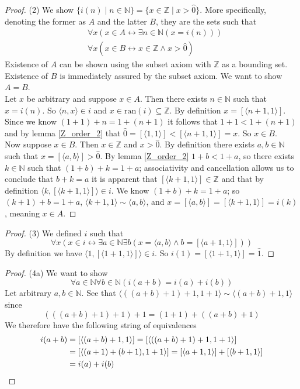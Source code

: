 \documentclass{report}
\begin{document}
\begin{proof}(2)
We show $\{i(n)\mid n\in\mathbb N\}=\{x\in\mathbb Z\mid x>\hat0\}$.
More specifically, denoting the former as $A$ and the latter $B$, they are the sets such that
\begin{align*}
&\forall x(x\in A\leftrightarrow\exists n\in\mathbb N(x=i(n)))\\
&\forall x(x\in B\leftrightarrow x\in\mathbb Z\land x>\hat0)
\end{align*}
Existence of $A$ can be shown using the subset axiom with $\mathbb Z$ as a bounding set. Existence of $B$ is immediately 
assured by the subset axiom. We want to show $A=B$.\\
\indent Let $x$ be arbitrary and suppose $x\in A$. Then there exists $n\in\mathbb N$ such that $x=i(n)$. So $\langle n,x\rangle\in i$ and 
$x\in\text{ran}(i)\subseteq\mathbb Z$. By definition $x=[\langle n+1,1\rangle]$. Since we know $(1+1)+n=1+(n+1)$ it follows that
$1+1<1+(n+1)$ and by lemma \ref{Z_order_2} that $\hat0=[\langle 1,1\rangle]<[\langle n+1,1\rangle]=x$. So $x\in B$.\\
\indent Now suppose $x\in B$. Then $x\in\mathbb Z$ and $x>\hat0$. By definition there exists $a,b\in\mathbb N$ such that 
$x=[\langle a,b\rangle]>\hat0$. By lemma \ref{Z_order_2} $1+b<1+a$, so there exists $k\in\mathbb N$ such that $(1+b)+k=1+a$;
associativity and cancellation allows us to conclude that $b+k=a$
it is apparent that $[\langle k+1,1\rangle]\in\mathbb Z$ and that by definition $\langle k,[\langle k+1,1\rangle]\rangle\in i$. 
We know $(1+b)+k=1+a$; so $(k+1)+b=1+a$,
$\langle k+1,1\rangle\sim\langle a,b\rangle$, and
$x=[\langle a,b\rangle]=[\langle k+1,1\rangle]=i(k)$, meaning $x\in A$.
\end{proof}
\begin{proof}(3)
We defined $i$ such that
\begin{equation*}
\forall x(x\in i\leftrightarrow\exists a\in\mathbb N\exists b(x=\langle a,b\rangle\land b=[\langle a+1,1\rangle]))
\end{equation*}
By definition we have $\langle 1,[\langle 1+1,1\rangle]\rangle\in i$. So
$i(1)=[\langle 1+1,1\rangle]=\hat1$.
\end{proof}
\begin{proof}(4a)
We want to show
\begin{equation*}
\forall a\in\mathbb N\forall b\in\mathbb N(i(a+b)=i(a)+i(b))
\end{equation*}
Let arbitrary $a,b\in\mathbb N$. See that $\langle((a+b)+1)+1,1+1\rangle\sim\langle(a+b)+1,1\rangle$ since 
\begin{equation*}
(((a+b)+1)+1)+1=(1+1)+((a+b)+1)
\end{equation*}
We therefore have the following string of equivalences
\begin{align*}
i(a+b)&=[\langle(a+b)+1,1\rangle]=[\langle((a+b)+1)+1,1+1\rangle]\\
&=[\langle (a+1)+(b+1),1+1\rangle]=[\langle a+1,1\rangle]+[\langle b+1,1\rangle]\\
&=i(a)+i(b)\qedhere
\end{align*}
\end{proof}
\end{document}
